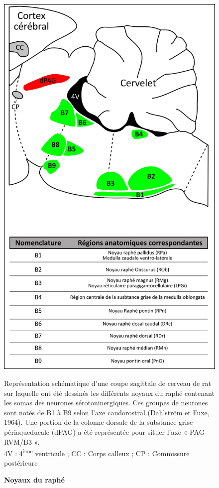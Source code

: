 \documentclass[a4paper,12pt,twoside]{report}
\begin{document}
\begin{figure}[p]

\begin{center}
 \includegraphics[scale=0.9]{Figure4.jpg} 
\end{center}

\caption{\textbf{Noyaux du raphé}}

{\protect\parbox[t]{18cm}{
\begin{small}
Représentation schématique d’une coupe sagittale de cerveau de rat sur laquelle ont été dessinés les différents noyaux du raphé contenant les somas des neurones sérotoninergiques. Ces groupes de neurones sont notés de B1 à B9 selon l’axe caudorostral (Dahlström et Fuxe, 1964). Une portion de la colonne dorsale de la substance grise périaqueducale (dPAG) a été représentée pour situer l’axe « PAG-RVM/B3 ».\\
4V : 4\textsuperscript{ème} ventricule ; CC : Corps calleux ; CP : Commissure postérieure \end{small}}}

\label{Figure 4}

\end{figure}
\end{document}

